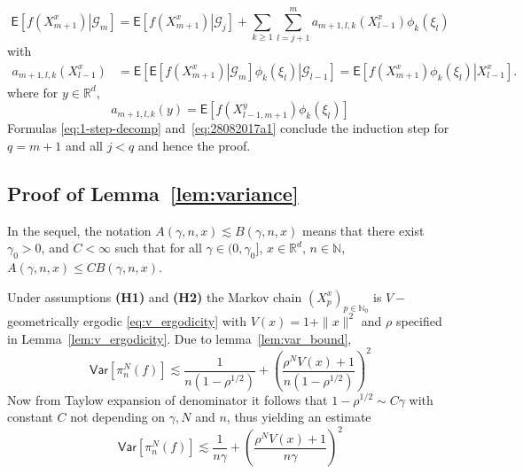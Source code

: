 \documentclass[bj]{imsart}
\def\PVar{\mathsf{Var}}
\def\nset{\mathbb{N}}
\def\rset{\mathbb{R}}
\def\rset{\mathbb{R}}
\begin{document}
\begin{equation}\label{eq:28082017a1}
\mathsf{E}\left[\left.f(X^x_{m+1})\right| \mathcal{G}_m \right]=\mathsf{E}\left[\left.f(X^x_{m+1})\right| \mathcal{G}_j \right]+\sum_{k\geq1}\sum_{l=j+1}^{m}a_{m+1,l,k}(X^x_{l-1})\phi_{k}(\xi_{l})
\end{equation}
with
\begin{align*}
a_{m+1,l,k}(X^x_{l-1}) &= \mathsf{E}\left[\left.\mathsf{E}\left[\left.f(X^x_{m+1})\right|\mathcal{G}_{m}\right]\phi_{k}(\xi_{l})\right|\mathcal{G}_{l-1}\right]
 = \mathsf{E}\left[\left.f(X^x_{m+1})\phi_{k}(\xi_{l})\right|X^x_{l-1}\right].
\end{align*}
where for $y \in \rset^d$,
\[
a_{m+1,l,k}(y) = \mathsf{E}\left[f(X^y_{l-1,m+1})\phi_{k}(\xi_{l})\right]
\]
Formulas \eqref{eq:1-step-decomp}
and~\eqref{eq:28082017a1} conclude the induction step for $q = m+1$ and all $j < q$ and hence the proof.


\subsection{Proof of Lemma~\ref{lem:variance}}
In the sequel, the notation $A(\gamma,n,x) \lesssim B(\gamma,n,x)$ means that there exist $\gamma_0 > 0$, and $C < \infty$ such that for all  $\gamma \in (0,\gamma_0]$, $x \in \rset^d$, $n \in \nset$, $A(\gamma,n,x) \leq C B(\gamma,n,x)$.

Under assumptions {\bf (H1)} and {\bf (H2)} the Markov chain $(X^x_{p})_{p \in \nset_0}$ is $V-$geometrically ergodic \eqref{eq:v_ergodicity} with $V(x) = 1+\|x\|^2$ and $\rho$ specified in Lemma~\ref{lem:v_ergodicity}. Due to lemma~\ref{lem:var_bound},
\[
\PVar[\pi_n^N(f)]\lesssim \frac{1}{n(1-\rho^{1/2})} + \left(\frac{\rho^NV(x)+1}{n(1-\rho^{1/2})}\right)^2
\]
Now from Taylow expansion of denominator it follows that $1-\rho^{1/2} \sim C\gamma$ with constant $C$ not depending on $\gamma,N$ and $n$, thus yielding an estimate
\[
\PVar[\pi_n^N(f)] \lesssim \frac{1}{n\gamma} + \left(\frac{\rho^NV(x)+1}{n\gamma}\right)^2
\]
\end{document}
